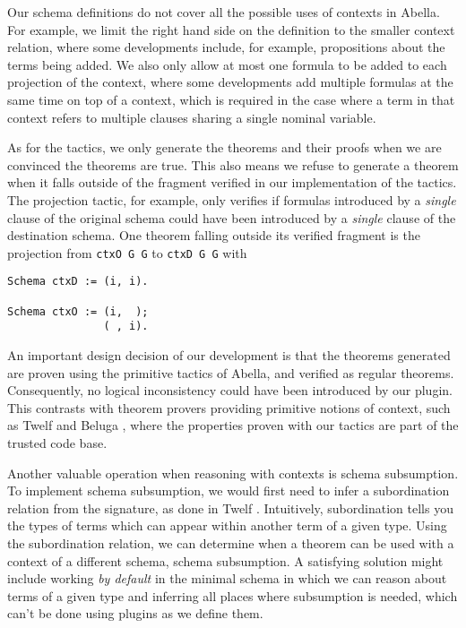 \documentclass[nocopyrightspace,authoryear]{sigplanconf}
\begin{document}
Our schema definitions do not cover all the possible uses of contexts in Abella. 
For example, we limit the right hand side on the definition to the smaller context relation, where some developments include, for example, propositions about the terms being added. We also only allow at most one formula to be added to each projection of the context, where some developments add multiple formulas at the same time on top of a context, which is required in the case where a term in that context refers to multiple clauses sharing a single nominal variable. %
 
As for the tactics, we only generate the theorems and their proofs when we are convinced the theorems are true. This also means we refuse to generate a theorem when it falls outside of the fragment verified in our implementation of the tactics. The projection tactic, for example, only verifies if formulas introduced by a \emph{single} clause of the original schema could have been introduced by a \emph{single} clause of the destination schema. One theorem falling outside its verified fragment is the projection from \lstinline|ctxO G G| to  \lstinline|ctxD G G| with
\begin{lstlisting}
Schema ctxD := (i, i).

Schema ctxO := (i,  );
               ( , i).
\end{lstlisting}


An important design decision of our development is that the theorems generated are proven using the primitive tactics of Abella, and verified as regular theorems. Consequently, no logical inconsistency could have been introduced by our plugin. This contrasts with theorem provers providing primitive notions of context, such as Twelf \cite{twelfsys} and Beluga \cite{belugasys}, where the properties proven with our tactics are part of the trusted code base.

Another valuable operation when reasoning with contexts is schema subsumption. To implement schema subsumption, we would first need to infer a subordination relation from the signature, as done in Twelf \cite{twelfsys}. Intuitively, subordination tells you the types of terms which can appear within another term of a given type. Using the subordination relation, we can determine when a theorem can be used with a context of a different schema, schema subsumption. A satisfying solution might include working \emph{by default} in the minimal schema in which we can reason about terms of a given type and inferring all places where subsumption is needed, which can't be done using plugins as we define them.
\end{document}
